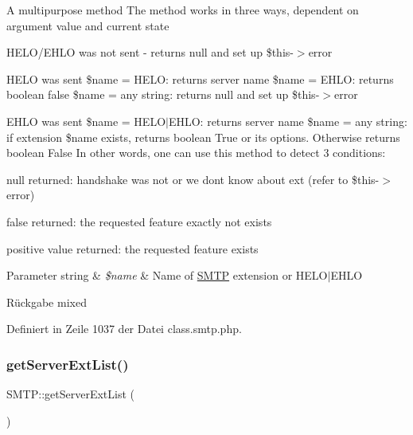 A multipurpose method The method works in three ways, dependent on argument value and current state
\begin{DoxyEnumerate}
\item H\+E\+L\+O/\+E\+H\+LO was not sent -\/ returns null and set up \$this-\/$>$error
\item H\+E\+LO was sent \$name = \textquotesingle{}H\+E\+LO\textquotesingle{}\+: returns server name \$name = \textquotesingle{}E\+H\+LO\textquotesingle{}\+: returns boolean false \$name = any string\+: returns null and set up \$this-\/$>$error
\item E\+H\+LO was sent \$name = \textquotesingle{}H\+E\+LO\textquotesingle{}$\vert$\textquotesingle{}E\+H\+LO\textquotesingle{}\+: returns server name \$name = any string\+: if extension \$name exists, returns boolean True or its options. Otherwise returns boolean False In other words, one can use this method to detect 3 conditions\+:
\end{DoxyEnumerate}

null returned\+: handshake was not or we don\textquotesingle{}t know about ext (refer to \$this-\/$>$error)
\begin{DoxyItemize}
\item false returned\+: the requested feature exactly not exists
\item positive value returned\+: the requested feature exists 
\begin{DoxyParams}[1]{Parameter}
string & {\em \$name} & Name of \mbox{\hyperlink{class_s_m_t_p}{S\+M\+TP}} extension or \textquotesingle{}H\+E\+LO\textquotesingle{}$\vert$\textquotesingle{}E\+H\+LO\textquotesingle{} \\
\hline
\end{DoxyParams}
\begin{DoxyReturn}{Rückgabe}
mixed 
\end{DoxyReturn}

\end{DoxyItemize}

Definiert in Zeile 1037 der Datei class.\+smtp.\+php.

\mbox{\label{class_s_m_t_p_a2d392b500c5aa5abc020d15215fd38e7}} 
\subsubsection{\texorpdfstring{get\+Server\+Ext\+List()}{getServerExtList()}}
{\footnotesize\ttfamily S\+M\+T\+P\+::get\+Server\+Ext\+List (\begin{DoxyParamCaption}{ }\end{DoxyParamCaption})}

